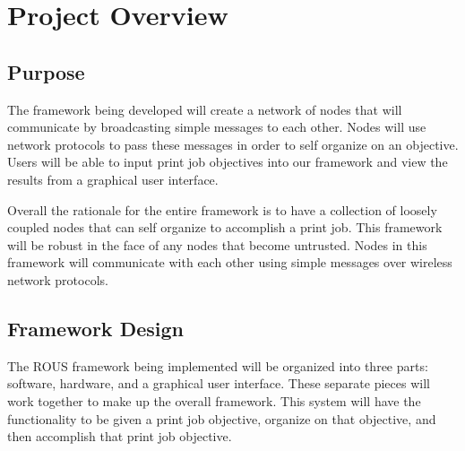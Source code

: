 \documentclass[draftclsnofoot, onecolumn, compsoc, 10pt]{IEEEtran}
\begin{document}

% 
%
%



\section{Project Overview}
\subsection{Purpose}
The framework being developed will create a network of nodes that will communicate by broadcasting simple messages to each other. Nodes will use network protocols to pass these messages in order to self organize on an objective. Users will be able to input print job objectives into our framework and view the results from a graphical user interface.

Overall the rationale for the entire framework is to have a collection of loosely coupled nodes that can self organize to accomplish a print job. This framework will be robust in the face of any nodes that become untrusted. Nodes in this framework will communicate with each other using simple messages over wireless network protocols.

\subsection{Framework Design}
The ROUS framework being implemented will be organized into three parts: software, hardware, and a graphical user interface. These separate pieces will work together to make up the overall framework. This system will have the functionality to be given a print job objective, organize on that objective, and then accomplish that print job objective.
\end{document}
